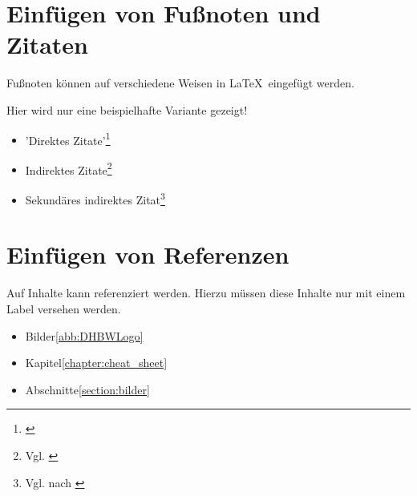\section{Einfügen von Fußnoten und Zitaten}\label{section:zitate}

Fußnoten können auf verschiedene Weisen in \LaTeX\ eingefügt werden.

Hier wird nur eine beispielhafte Variante gezeigt!

    \begin{itemize}
        \item 'Direktes Zitate'\footnote{\cite[S. 114ff.]{Mayring2002}}
        \item Indirektes Zitate\footnote{Vgl. \cite[S. 114ff.]{Mayring2002}}
        \item Sekundäres indirektes Zitat\footnote{Vgl. \cite[S. 114ff.]{Mayring2002} nach \cite{Endres}}
    \end{itemize}

\section{Einfügen von Referenzen}\label{section:referenzen}

Auf Inhalte kann referenziert werden. Hierzu müssen diese Inhalte nur mit einem Label versehen werden.

    \begin{itemize}
        \item Bilder\ref{abb:DHBWLogo}
        \item Kapitel\ref{chapter:cheat_sheet}
        \item Abschnitte\ref{section:bilder}
    \end{itemize}

